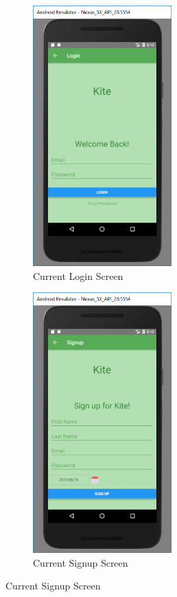 \documentclass[compsoc, 10, draftclsnofoot, onecolumn]{IEEEtran}
\begin{document}
\begin{figure}[h]
\begin{subfigure}{0.5\textwidth}
\includegraphics[height=10cm]{login.PNG}
  \caption{Current Login Screen}	
\end{subfigure}
\begin{subfigure}{0.5\textwidth}
  \includegraphics[height=10cm]{Signup.PNG}
  \caption{Current Signup Screen}
\end{subfigure}
\end{figure}
\FloatBarrier
\end{document}
